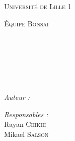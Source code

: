 
\begin{titlepage}

\begin{center}

\begin{minipage}[t]{0.48\textwidth}
  \begin{flushleft}
    \begin{spacing}{1.5}
      \textsc{\large Université de Lille 1}
    \end{spacing}
  \end{flushleft}
\end{minipage}
\begin{minipage}[t]{0.48\textwidth}
  \begin{flushright}
    \textsc{\large Équipe Bonsai}
  \end{flushright}
\end{minipage} \\[1.5cm]

%


\textsc{\Large \reportsubject}\\[0.5cm]
\HRule \\[0.4cm]
{\LARGE \bfseries \reporttitle}\\[0.4cm]
\HRule \\[1.5cm]

\begin{minipage}[t]{0.3\textwidth}
  \begin{flushleft} \large
    \emph{Auteur :}\\
    \reportauthor
  \end{flushleft}
\end{minipage}
\begin{minipage}[t]{0.6\textwidth}
  \begin{flushright} \large
    \emph{Responsables :} \\
    Rayan \textsc{Chikhi} \\
    Mikael \textsc{Salson}
  \end{flushright}
\end{minipage}


\end{center}
\end{titlepage}
